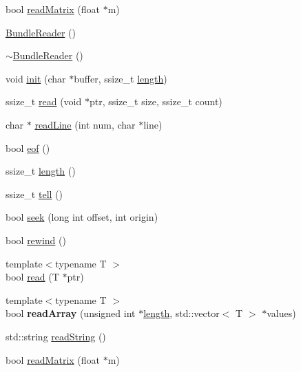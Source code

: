 \begin{DoxyCompactItemize}
bool \hyperlink{classBundleReader_a50ad5f05a615c668967da07e1345d931}{read\+Matrix} (float $\ast$m)
\item 
\hyperlink{classBundleReader_a3aea077c1877188a489dba8c4deb8423}{Bundle\+Reader} ()
\item 
\hyperlink{classBundleReader_a74fc64e8701659f72821a8b91373500a}{$\sim$\+Bundle\+Reader} ()
\item 
void \hyperlink{classBundleReader_a1f8504dc88fa7abf9e4017430a0e8dd8}{init} (char $\ast$buffer, ssize\+\_\+t \hyperlink{classBundleReader_a943403eea21a70e9dea729f1371a1195}{length})
\item 
ssize\+\_\+t \hyperlink{classBundleReader_a25a45788ea1f4e1e072442ba80065354}{read} (void $\ast$ptr, ssize\+\_\+t size, ssize\+\_\+t count)
\item 
char $\ast$ \hyperlink{classBundleReader_abc32008d82d452279dfb186c6b3384fe}{read\+Line} (int num, char $\ast$line)
\item 
bool \hyperlink{classBundleReader_aa83930c070d01dd451c851310c25f85d}{eof} ()
\item 
ssize\+\_\+t \hyperlink{classBundleReader_a943403eea21a70e9dea729f1371a1195}{length} ()
\item 
ssize\+\_\+t \hyperlink{classBundleReader_ae2a6757717aa327231c2ac330ffcda5b}{tell} ()
\item 
bool \hyperlink{classBundleReader_a6ac7f8410a0b94d63a74e547825e8203}{seek} (long int offset, int origin)
\item 
bool \hyperlink{classBundleReader_afae9c7d45bda94453c01ac6aeb821b07}{rewind} ()
\item 
{\footnotesize template$<$typename T $>$ }\\bool \hyperlink{classBundleReader_a845eab6bd3f1e7af0c27e5a6d994a8a6}{read} (T $\ast$ptr)
\item 
\mbox{\label{classBundleReader_a7887471de8c65d1e03b8f095190ed6fc}} 
{\footnotesize template$<$typename T $>$ }\\bool {\bfseries read\+Array} (unsigned int $\ast$\hyperlink{classBundleReader_a943403eea21a70e9dea729f1371a1195}{length}, std\+::vector$<$ T $>$ $\ast$values)
\item 
std\+::string \hyperlink{classBundleReader_aae1069e8afb7ede1bcdec1475785975b}{read\+String} ()
\item 
bool \hyperlink{classBundleReader_a50ad5f05a615c668967da07e1345d931}{read\+Matrix} (float $\ast$m)
\end{DoxyCompactItemize}


